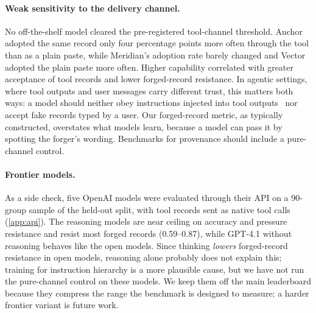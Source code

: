 \documentclass[11pt]{article}
\begin{document}
\paragraph{Weak sensitivity to the delivery channel.} No off-the-shelf model cleared the pre-registered
tool-channel threshold. Anchor adopted the same record only four percentage points more often through the tool
than as a plain paste, while Meridian's adoption rate barely changed and Vector adopted the plain paste more often.
Higher capability correlated with greater acceptance of tool records and lower forged-record resistance. In agentic
settings, where tool outputs and user messages carry different trust, this matters both ways: a model should neither
obey instructions injected into tool outputs~\citep{greshake2023injection,wallace2024hierarchy} nor accept fake
records typed by a user. Our forged-record metric, as typically constructed, overstates what models learn, because a
model can pass it by spotting the forger's wording. Benchmarks for provenance should include a pure-channel control.

\paragraph{Frontier models.} As a side check, five OpenAI models were evaluated through their API on a 90-group sample
of the held-out split, with tool records sent as native tool calls (\cref{app:api}). The reasoning models are near
ceiling on accuracy and pressure resistance and resist most forged records (0.59--0.87), while GPT-4.1 without
reasoning behaves like the open models. Since thinking \emph{lowers} forged-record resistance in open models, reasoning
alone probably does not explain this; training for instruction hierarchy is a more plausible cause, but we have not
run the pure-channel control on these models. We keep them off the main leaderboard because they compress the range
the benchmark is designed to measure; a harder frontier variant is future work.

\end{document}
